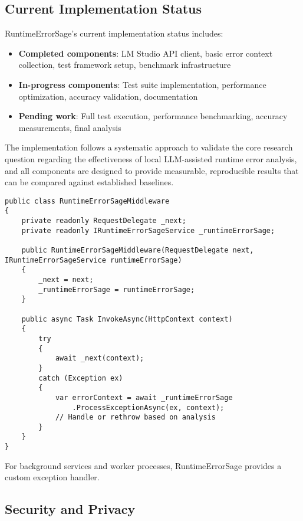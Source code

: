 \subsection{Current Implementation Status}
RuntimeErrorSage's current implementation status includes:

\begin{itemize}
\item \textbf{Completed components}: LM Studio API client, basic error context collection, test framework setup, benchmark infrastructure
\item \textbf{In-progress components}: Test suite implementation, performance optimization, accuracy validation, documentation
\item \textbf{Pending work}: Full test execution, performance benchmarking, accuracy measurements, final analysis
\end{itemize}

The implementation follows a systematic approach to validate the core research question regarding the effectiveness of local LLM-assisted runtime error analysis, and all components are designed to provide measurable, reproducible results that can be compared against established baselines.

\begin{lstlisting}[style=csharpstyle,caption={ASP.NET Core Middleware Integration},label=lst:middleware-impl]
public class RuntimeErrorSageMiddleware
{
    private readonly RequestDelegate _next;
    private readonly IRuntimeErrorSageService _runtimeErrorSage;

    public RuntimeErrorSageMiddleware(RequestDelegate next, IRuntimeErrorSageService runtimeErrorSage)
    {
        _next = next;
        _runtimeErrorSage = runtimeErrorSage;
    }

    public async Task InvokeAsync(HttpContext context)
    {
        try
        {
            await _next(context);
        }
        catch (Exception ex)
        {
            var errorContext = await _runtimeErrorSage
                .ProcessExceptionAsync(ex, context);
            // Handle or rethrow based on analysis
        }
    }
}
\end{lstlisting}

For background services and worker processes, RuntimeErrorSage provides a custom exception handler.

\subsection{Security and Privacy}

